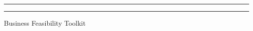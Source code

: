 %   
\begin{titlepage}
  \centering
  \vspace*{2cm}
  {\color{bftCoral}\rule{\textwidth}{2pt}\par}
  \vspace{0.8cm}
  {\large\textsc{\tipoDocumento}\par}
  \vspace{0.6cm}
  {\Huge\bfseries\tituloProyecto\par}
  \vspace{0.5cm}
  {\large\subtituloProyecto\par}
  \vspace{1.2cm}
  {\color{bftCoral}\rule{0.25\textwidth}{2pt}\par}
  \vspace{1.2cm}
  {\large\autorProyecto\par}
  \vspace{0.4cm}
  {\large\fechaProyecto\par}
  \vspace{0.4cm}
  {\small\textsc{\versionDoc}\par}
  \vfill
  {\footnotesize Business Feasibility Toolkit\par}
\end{titlepage}
